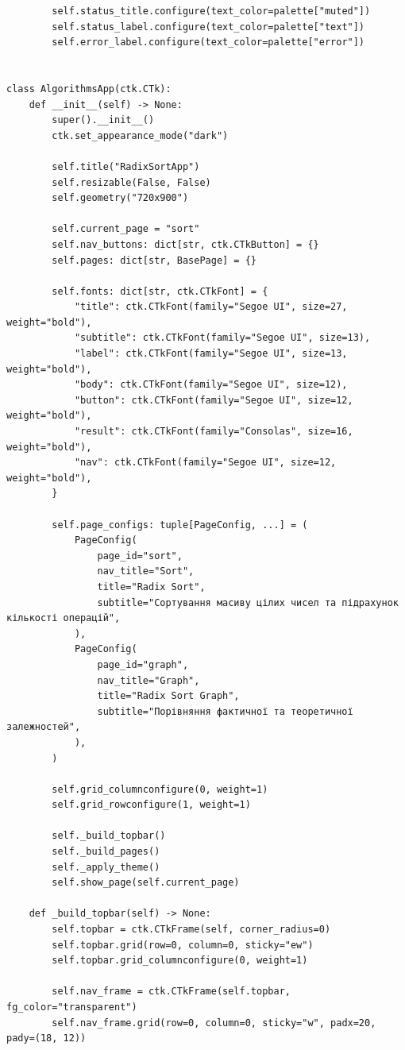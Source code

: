 \documentclass[12pt,a4paper]{article}
\begin{document}
\begin{verbatim}
        self.status_title.configure(text_color=palette["muted"])
        self.status_label.configure(text_color=palette["text"])
        self.error_label.configure(text_color=palette["error"])


class AlgorithmsApp(ctk.CTk):
    def __init__(self) -> None:
        super().__init__()
        ctk.set_appearance_mode("dark")

        self.title("RadixSortApp")
        self.resizable(False, False)
        self.geometry("720x900")

        self.current_page = "sort"
        self.nav_buttons: dict[str, ctk.CTkButton] = {}
        self.pages: dict[str, BasePage] = {}

        self.fonts: dict[str, ctk.CTkFont] = {
            "title": ctk.CTkFont(family="Segoe UI", size=27, weight="bold"),
            "subtitle": ctk.CTkFont(family="Segoe UI", size=13),
            "label": ctk.CTkFont(family="Segoe UI", size=13, weight="bold"),
            "body": ctk.CTkFont(family="Segoe UI", size=12),
            "button": ctk.CTkFont(family="Segoe UI", size=12, weight="bold"),
            "result": ctk.CTkFont(family="Consolas", size=16, weight="bold"),
            "nav": ctk.CTkFont(family="Segoe UI", size=12, weight="bold"),
        }

        self.page_configs: tuple[PageConfig, ...] = (
            PageConfig(
                page_id="sort",
                nav_title="Sort",
                title="Radix Sort",
                subtitle="Сортування масиву цілих чисел та підрахунок кількості операцій",
            ),
            PageConfig(
                page_id="graph",
                nav_title="Graph",
                title="Radix Sort Graph",
                subtitle="Порівняння фактичної та теоретичної залежностей",
            ),
        )

        self.grid_columnconfigure(0, weight=1)
        self.grid_rowconfigure(1, weight=1)

        self._build_topbar()
        self._build_pages()
        self._apply_theme()
        self.show_page(self.current_page)

    def _build_topbar(self) -> None:
        self.topbar = ctk.CTkFrame(self, corner_radius=0)
        self.topbar.grid(row=0, column=0, sticky="ew")
        self.topbar.grid_columnconfigure(0, weight=1)

        self.nav_frame = ctk.CTkFrame(self.topbar, fg_color="transparent")
        self.nav_frame.grid(row=0, column=0, sticky="w", padx=20, pady=(18, 12))


\end{verbatim}
\end{document}

